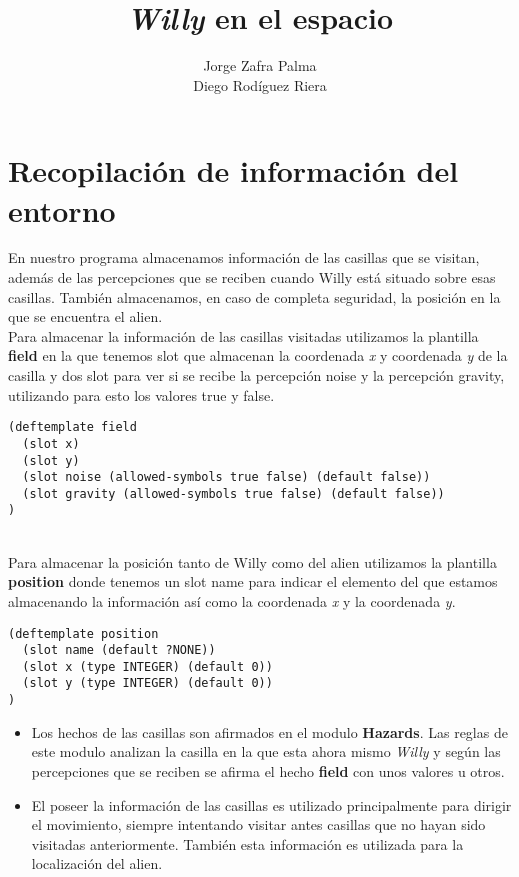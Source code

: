 \documentclass[a4paper,10pt]{article}
\author{Jorge Zafra Palma\\Diego Rodíguez Riera}
\title{{\it Willy} en el espacio}
\begin{document}
\maketitle
\pagebreak
\tableofcontents
\pagebreak
\section{Recopilación de información del entorno}
\vspace{0.5 cm}
\normalsize
En nuestro programa almacenamos información de las casillas que se visitan, además de las percepciones que se reciben cuando  Willy está situado sobre esas casillas. También almacenamos, en caso de completa seguridad, la posición en la que se encuentra el alien.
\vspace{0.5 cm}\\
Para almacenar la información de las casillas visitadas utilizamos la plantilla {\bf field} en la que tenemos slot que almacenan la coordenada {\it x} y coordenada {\it y}  de la casilla y dos slot para ver si se recibe la percepción noise y la percepción gravity, utilizando para esto los valores true y false.\\
\footnotesize
\begin{lstlisting}
(deftemplate field
  (slot x)
  (slot y)
  (slot noise (allowed-symbols true false) (default false))
  (slot gravity (allowed-symbols true false) (default false))
)
\end{lstlisting}
\normalsize
\vspace{0.5 cm}\\
Para almacenar la posición tanto de  Willy como del alien utilizamos la plantilla {\bf position} donde tenemos un slot name para indicar el elemento del que estamos almacenando la información así como la coordenada {\it x} y la coordenada {\it y}.
\footnotesize
\begin{lstlisting}
(deftemplate position
  (slot name (default ?NONE))
  (slot x (type INTEGER) (default 0))
  (slot y (type INTEGER) (default 0))
)
\end{lstlisting}
\normalsize
\begin{itemize}
	\item Los hechos de las casillas son afirmados en el modulo {\bf Hazards}. Las reglas de este modulo analizan la casilla en la que esta ahora mismo {\it Willy} y según las percepciones que se reciben se afirma el hecho {\bf field} con unos valores u otros.
	\item El poseer la información de las casillas es utilizado principalmente para dirigir el     movimiento, siempre intentando visitar antes casillas que no hayan sido visitadas     anteriormente. También esta información es utilizada para la localización del alien.
\end{itemize}
\pagebreak
\end{document}
